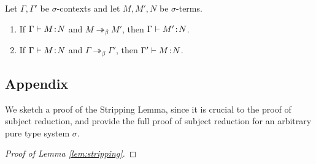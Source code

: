 \documentclass[reqno, twoside]{article}
\begin{document}
    \begin{theorem}\label{thm:subject_reduction}
        Let $\Gamma,\Gamma'$ be $\sigma$-contexts and let $M,M',N$ be $\sigma$-terms.
        \begin{enumerate}
            \item If $\Gamma\vdash M\!:\!N$ and $M\twoheadrightarrow_\beta M'$, then $\Gamma\vdash M'\!:\! N$.
                \vspace{-0.05in}
            \item If $\Gamma\vdash M\!:\!N$ and $\Gamma\twoheadrightarrow_\beta\Gamma'$, then $\Gamma'\vdash M\!:\! N$.
        \end{enumerate}
    \end{theorem}

    \subsection*{Appendix}

    We sketch a proof of the Stripping Lemma, since it is crucial to the proof of subject reduction, and provide the full proof of subject reduction for an arbitrary pure type system $\sigma$.

    \begin{proof}[Proof of Lemma \ref{lem:stripping}]
        \TODO
    \end{proof}
\end{document}
